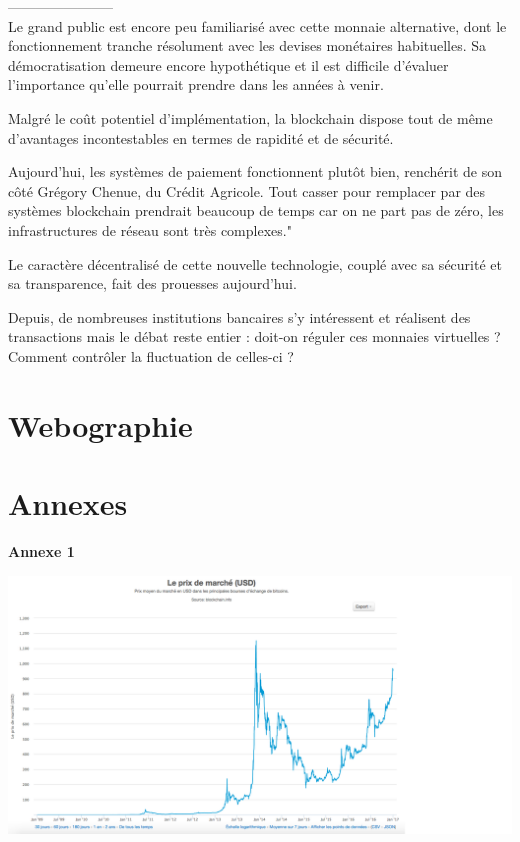 \documentclass[12pt]{report}
\begin{document}
\hspace{1cm} 

-----------------------\\



Le grand public est encore peu familiarisé avec cette monnaie alternative, dont le fonctionnement tranche résolument avec les devises monétaires habituelles. Sa démocratisation demeure encore hypothétique et il est difficile d’évaluer l’importance qu’elle pourrait prendre dans les années à venir.

Malgré le coût potentiel d'implémentation, la blockchain dispose tout de même d'avantages incontestables en termes de rapidité et de sécurité.

Aujourd'hui, les systèmes de paiement fonctionnent plutôt bien, renchérit de son côté Grégory Chenue, du Crédit Agricole. Tout casser pour remplacer par des systèmes blockchain prendrait beaucoup de temps car on ne part pas de zéro, les infrastructures de réseau sont très complexes."


 Le caractère décentralisé de cette nouvelle technologie, couplé avec sa sécurité et sa transparence, fait des prouesses aujourd’hui.
 
 Depuis, de nombreuses institutions bancaires s’y intéressent et réalisent des transactions mais le débat reste entier : doit-on réguler ces monnaies virtuelles ? Comment contrôler la fluctuation de celles-ci ? \\

\newpage
\section{Webographie}

\newpage
\section{Annexes}

\textbf{Annexe 1}\\
\begin{center}
    \includegraphics[width=1.3\textwidth]{courbeBTC}
\end{center}
\end{document}
